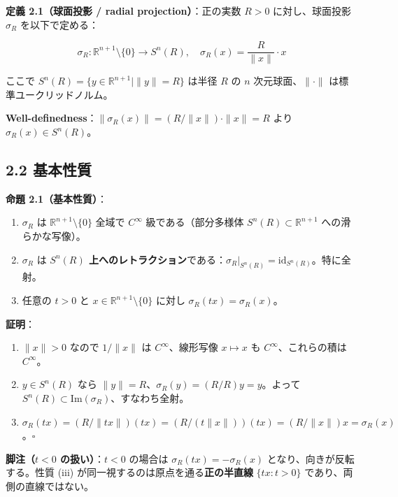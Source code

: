\documentclass[
]{ltjsarticle}
\begin{document}
\textbf{定義 2.1（球面投影 / radial projection）}：正の実数 \(R > 0\)
に対し、球面投影 \(\sigma_R\) を以下で定める：

\[\sigma_R: \mathbb{R}^{n+1} \setminus \{0\} \to S^n(R), \quad \sigma_R(x) = \frac{R}{\|x\|} \cdot x \tag{2.1}\]

ここで \(S^n(R) = \{y \in \mathbb{R}^{n+1} \mid \|y\| = R\}\) は半径
\(R\) の \(n\) 次元球面、\(\|\cdot\|\) は標準ユークリッドノルム。

\textbf{Well-definedness}：\(\|\sigma_R(x)\| = (R/\|x\|) \cdot \|x\| = R\)
より \(\sigma_R(x) \in S^n(R)\)。

\subsection{2.2 基本性質}\label{ux57faux672cux6027ux8cea}

\textbf{命題 2.1（基本性質）}：

\begin{enumerate}
\def\labelenumi{(\roman{enumi})}
\item
  \(\sigma_R\) は \(\mathbb{R}^{n+1} \setminus \{0\}\) 全域で
  \(C^\infty\) 級である（部分多様体 \(S^n(R) \subset \mathbb{R}^{n+1}\)
  への滑らかな写像）。
\item
  \(\sigma_R\) は \textbf{\(S^n(R)\)
  上へのレトラクション}である：\(\sigma_R \big|_{S^n(R)} = \mathrm{id}_{S^n(R)}\)。特に全射。
\item
  任意の \(t > 0\) と \(x \in \mathbb{R}^{n+1} \setminus \{0\}\) に対し
  \(\sigma_R(tx) = \sigma_R(x)\)。
\end{enumerate}

\textbf{証明}：

\begin{enumerate}
\def\labelenumi{(\roman{enumi})}
\item
  \(\|x\| > 0\) なので \(1/\|x\|\) は \(C^\infty\)、線形写像
  \(x \mapsto x\) も \(C^\infty\)、これらの積は \(C^\infty\)。
\item
  \(y \in S^n(R)\) なら
  \(\|y\| = R\)、\(\sigma_R(y) = (R/R) y = y\)。よって
  \(S^n(R) \subset \mathrm{Im}(\sigma_R)\)、すなわち全射。
\item
  \(\sigma_R(tx) = (R/\|tx\|)(tx) = (R/(t\|x\|))(tx) = (R/\|x\|) x = \sigma_R(x)\)。\(\square\)
\end{enumerate}

\textbf{脚注（\(t < 0\) の扱い）}：\(t < 0\) の場合は
\(\sigma_R(tx) = -\sigma_R(x)\) となり、向きが反転する。性質 (iii)
が同一視するのは原点を通る\textbf{正の半直線} \(\{tx : t > 0\}\)
であり、両側の直線ではない。
\end{document}
